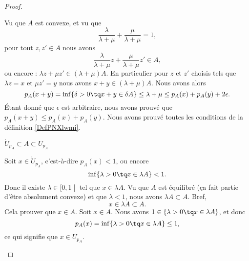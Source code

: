 \begin{proof}
\begin{subproof}
		Vu que \( A\) est convexe, et vu que
		\begin{equation}
			\frac{ \lambda }{\lambda+\mu }+\frac{ \mu }{ \lambda+\mu }=1,
		\end{equation}
		pour tout \( z,z'\in A\) nous avons
		\begin{equation}
			\frac{ \lambda }{ \lambda+\mu }z+\frac{ \mu }{ \lambda+\mu }z'\in A,
		\end{equation}
		ou encore : \( \lambda z+\mu z'\in(\lambda+\mu)A\). En particulier pour \( z\) et \( z'\) choisis tels que \( \lambda z=x\) et \( \mu z'=y\) nous avons \( x+y\in (\lambda+\mu)A\). Nous avons alors
		\begin{equation}
			p_A(x+y)=\inf\{ \delta>0\tq x+y\in \delta A \}\leq \lambda+\mu\leq p_A(x)+p_A(y)+2\epsilon.
		\end{equation}
		Étant donné que \( \epsilon\) est arbitraire, nous avons prouvé que \( p_A(x+y)\leq p_A(x)+p_A(y)\).
		Nous avons prouvé toutes les conditions de la définition \ref{DefPNXlwmi}.
	\end{subproof}
	\begin{proofpart}
		$\mathring{U}_{p_A}\subset A\subset U_{p_A}$
	\end{proofpart}
	\begin{subproof}
		Soit \( x\in \mathring{U}_{p_A}\), c'est-à-dire \( p_A(x)<1\), ou encore
		\begin{equation}
			\inf\{ \lambda>0\tq x\in \lambda A \}<1.
		\end{equation}
		Donc il existe \( \lambda\in \mathopen[ 0,1\mathclose[\) tel que \( x\in \lambda A\). Vu que \( A\) est équilibré (ça fait partie d'être absolument convexe) et que \( \lambda<1\), nous avons \( \lambda A\subset A\). Bref,
		\begin{equation}
			x\in \lambda A\subset A.
		\end{equation}
		Cela prouver que \( x\in A\).
		Soit \( x\in A\). Nous avons \( 1\in\{ \lambda >0\tq x\in \lambda A \}\), et donc
		\begin{equation}
			p_A(x)=\inf\{ \lambda >0\tq x\in \lambda A \}\leq 1,
		\end{equation}
		ce qui signifie que \( x\in U_{p_A}\).
	\end{subproof}
\end{proof}


